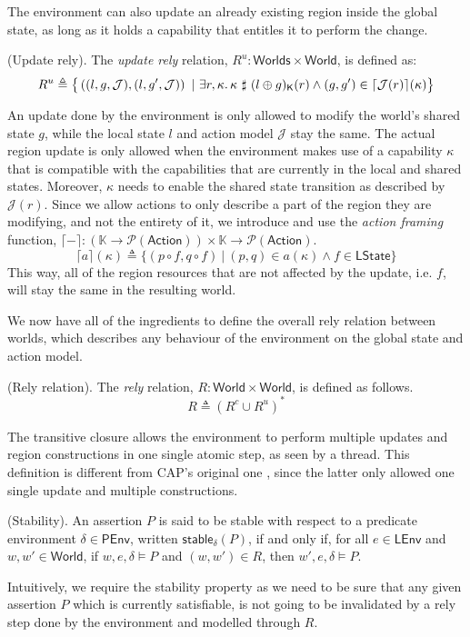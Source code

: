 The environment can also update an already existing region inside the global state, as long as it holds a capability that entitles it to perform the change.
\begin{defn}
	(Update rely).
	The \emph{update rely} relation, $R^u : \mathsf{Worlds} \times \mathsf{World}$, is defined as:
	\[
		R^u \triangleq \big\{ \left( (l, g, \mathcal{J}), (l, g', \mathcal{J}) \right)\ |\ \exists r, \kappa \ldotp  \kappa\ \sharp\ (l \oplus g)_\mathsf{K}(r) \land (g, g') \in \lceil \mathcal{J}(r) \rceil (\kappa) \big\}
	\]
\end{defn}
An update done by the environment is only allowed to modify the world's shared state $g$, while the local state $l$ and action model $\mathcal{J}$ stay the same. The actual region update is only allowed when the environment makes use of a capability $\kappa$ that is compatible with the capabilities that are currently in the local and shared states. Moreover, $\kappa$ needs to enable the shared state transition as described by $\mathcal{J}(r)$. Since we allow actions to only describe a part of the region they are modifying, and not the entirety of it, we introduce and use the \emph{action framing} function, $\lceil - \rceil : \left( \mathbb{K} \rightarrow \mathcal{P}(\mathsf{Action}) \right) \times \mathbb{K} \rightarrow \mathcal{P}(\mathsf{Action})$.
	\[
		\lceil a \rceil (\kappa) \triangleq \{ (p \circ f, q \circ f)\ |\ (p, q) \in a(\kappa) \land f \in \mathsf{LState} \}
	\]
This way, all of the region resources that are not affected by the update, i.e. $f$, will stay the same in the resulting world.

We now have all of the ingredients to define the overall rely relation between worlds, which describes any behaviour of the environment on the global state and action model.
\begin{defn}
	(Rely relation).
	The \emph{rely} relation, $R : \mathsf{World} \times \mathsf{World}$, is defined as follows.
	\[
		R \triangleq (R^c \cup R^u)^*
	\]
\end{defn}
The transitive closure allows the environment to perform multiple updates and region constructions in one single atomic step, as seen by a thread. This definition is different from CAP's original one \cite{cap}, since the latter only allowed one single update and multiple constructions.

\begin{defn}
	(Stability).
	An assertion $P$ is said to be stable with respect to a predicate environment $\delta \in \mathsf{PEnv}$, written $\mathsf{stable}_\delta(P)$, if and only if, for all $e \in \mathsf{LEnv}$ and $w, w' \in \mathsf{World}$, if $w, e, \delta \vDash P$ and $(w, w') \in R$, then $w', e, \delta \vDash P$.
\end{defn}	
Intuitively, we require the stability property as we need to be sure that any given assertion $P$ which is currently satisfiable, is not going to be invalidated by a rely step done by the environment and modelled through $R$.


